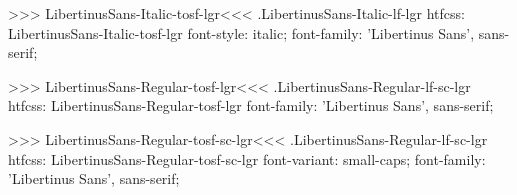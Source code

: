 >>>
\<LibertinusSans-Italic-tosf-lgr\><<<
.LibertinusSans-Italic-lf-lgr
htfcss:  LibertinusSans-Italic-tosf-lgr  font-style: italic; font-family: 'Libertinus Sans', sans-serif;

>>>
\<LibertinusSans-Regular-tosf-lgr\><<<
.LibertinusSans-Regular-lf-sc-lgr
htfcss:  LibertinusSans-Regular-tosf-lgr  font-family: 'Libertinus Sans', sans-serif;

>>>
\<LibertinusSans-Regular-tosf-sc-lgr\><<<
.LibertinusSans-Regular-lf-sc-lgr
htfcss:  LibertinusSans-Regular-tosf-sc-lgr  font-variant: small-caps; font-family: 'Libertinus Sans', sans-serif;

